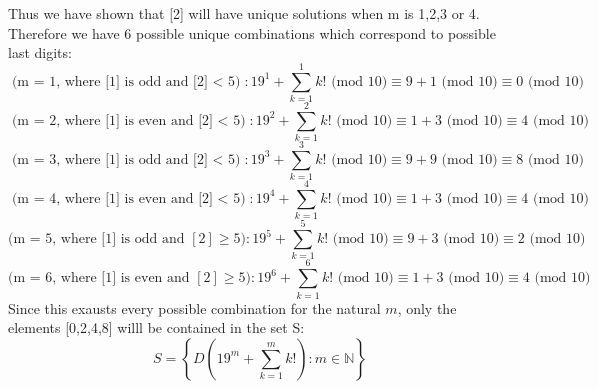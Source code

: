 \documentclass[11pt]{article}
\begin{document}
Thus we have shown that [2] will have unique solutions when m is 1,2,3 or 4. \\
Therefore we have 6 possible unique combinations which correspond to possible last digits:
\[ \text{(m = 1, where [1] is odd and [2] $<$ 5)}: 19^1 + \sum\limits_{k = 1}^1 k! \text{ (mod 10)} \equiv 9 + 1 \text{ (mod 10)} \equiv 0 \text{ (mod 10)} \]
\[ \text{(m = 2, where [1] is even and [2] $<$ 5)}: 19^2 + \sum\limits_{k = 1}^2 k! \text{ (mod 10)} \equiv 1 + 3 \text{ (mod 10)} \equiv 4 \text{ (mod 10)} \]
\[ \text{(m = 3, where [1] is odd and [2] $<$ 5)}: 19^3 + \sum\limits_{k = 1}^3 k! \text{ (mod 10)} \equiv 9 + 9 \text{ (mod 10)} \equiv 8 \text{ (mod 10)} \]
\[ \text{(m = 4, where [1] is even and [2] $<$ 5)}: 19^4 + \sum\limits_{k = 1}^4 k! \text{ (mod 10)} \equiv 1 + 3 \text{ (mod 10)} \equiv 4 \text{ (mod 10)} \]
\[ \text{(m = 5, where [1] is odd and $[2] \geq 5$)}: 19^5 + \sum\limits_{k = 1}^5 k! \text{ (mod 10)} \equiv 9 + 3 \text{ (mod 10)} \equiv 2 \text{ (mod 10)} \]
\[ \text{(m = 6, where [1] is even and $[2] \geq 5$)}: 19^6 + \sum\limits_{k = 1}^6 k! \text{ (mod 10)} \equiv 1 + 3 \text{ (mod 10)} \equiv 4 \text{ (mod 10)} \]
Since this exausts every possible combination for the natural $m$, only the elements [0,2,4,8] willl be contained in the set S:
\[ S = \left\{D\left(19^m + \sum\limits_{k = 1}^m k!\right) \colon m \in \mathbb N\right\} \]
\end{document}
